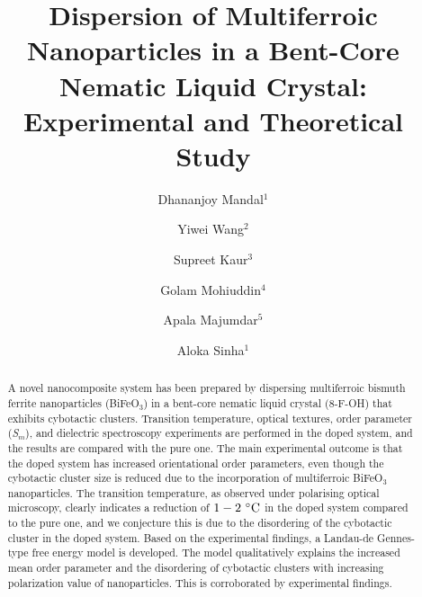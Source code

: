 \documentclass[reprint,amsfonts,amsmath,amssymb,aps,pre,floatfix,10pt]{revtex4-1}
\begin{document}
\title{Dispersion of Multiferroic Nanoparticles in a Bent-Core Nematic Liquid Crystal: Experimental and Theoretical Study}  
\author{Dhananjoy Mandal$^1$}
\author{Yiwei Wang$^2$}
\author{Supreet Kaur$^3$}
\author{Golam Mohiuddin$^4$}
\author{Apala Majumdar$^5$}
\author{Aloka Sinha$^1$}


\begin{abstract}

A novel nanocomposite system has been prepared  by dispersing multiferroic bismuth ferrite nanoparticles (BiFeO$_3$) in a bent-core nematic liquid crystal (8-F-OH) that exhibits cybotactic clusters. Transition temperature, optical textures, order parameter (\emph{S$_{m}$}), and dielectric spectroscopy experiments are performed in the doped system, and the results are compared with the pure one. The main experimental outcome is that the doped system has increased orientational order parameters, even though the cybotactic cluster size is reduced due to the incorporation of multiferroic BiFeO$_3$ nanoparticles. The transition temperature, as observed under polarising optical microscopy, clearly indicates a reduction of $1 - 2~ ^\circ{\rm C}$ in the doped system compared to the pure one, and we conjecture this is due to the disordering of the cybotactic cluster in the doped system. Based on the experimental findings, a Landau-de Gennes-type free energy model is developed. The model qualitatively explains the increased mean order parameter and the disordering of cybotactic clusters with increasing polarization value of nanoparticles. This is corroborated by experimental findings.  

\end{abstract}

\maketitle
\end{document}
